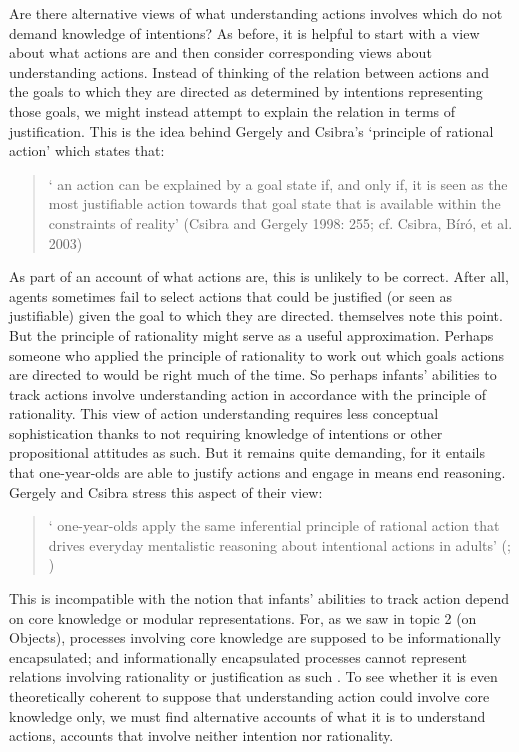 \documentclass[12pt,\papersize]{extarticle}
\begin{document}
Are there alternative views of what understanding actions involves which do not demand knowledge of intentions?
As before, it is helpful to start with a view about what actions are and then consider corresponding views about understanding actions.
Instead of thinking of the relation between actions and the goals to which they are directed as determined by intentions representing those goals,
we might instead attempt to explain the relation in terms of justification.
This is the idea behind Gergely and Csibra's `principle of rational action' which states that:
%
\begin{quote}
`%
an action can be explained by a goal state if, and only if, it is seen as the most justifiable action towards that goal state that is available within the constraints of reality' 
(Csibra and Gergely 1998: 255; cf. Csibra, Bíró, et al. 2003)
\end{quote}
%
As part of an account of what actions are, this is unlikely to be correct.
After all, agents sometimes fail to select actions that could be justified (or seen as justifiable) given the goal to which they are directed.
\citet[p.\ 123]{Csibra:2003jv} themselves note this point.
But the principle of rationality might serve as a useful approximation.
Perhaps someone who applied the principle of rationality to work out which goals actions are directed to would be right much of the time. 
So perhaps infants' abilities to track actions involve understanding action in accordance with the principle of rationality.
This view of action understanding requires less conceptual sophistication thanks to not requiring knowledge of intentions or other propositional attitudes as such. 
But it remains quite demanding, for it entails that one-year-olds  are able to justify actions and engage in means end reasoning.
Gergely and Csibra stress this aspect of their view:
%
\begin{quote}
`%
one-year-olds apply the same inferential principle of rational action that drives everyday mentalistic reasoning about intentional actions in adults' (\citealp[p.\ 259]{Csibra:1998cx}; \citealp[compare][p.\ 290]{Gergely:2003gb})
\end{quote}
%
This is incompatible with the notion that infants' abilities to track action depend on core knowledge or modular representations.
For, as we saw in topic 2 (on Objects),  processes involving core knowledge  are supposed to be informationally encapsulated;
and informationally encapsulated processes cannot represent relations involving rationality or justification as such \citep{Fodor:2000cj}.
To see whether it is even theoretically coherent to suppose that understanding action could involve core knowledge only, we must find alternative accounts of what it is to understand actions, accounts that involve neither intention nor rationality.
\end{document}
